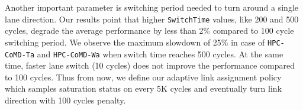 Another important parameter is switching period needed to turn around a 
single lane direction. Our results point that higher \texttt{SwitchTime} 
values, like 200 and 500 cycles, degrade the average performance by less 
than 2\% compared to 100 cycle switching period. We observe the maximum 
slowdown of 25\% in case of \texttt{HPC-CoMD-Ta} and \texttt{HPC-CoMD-Wa} 
when switch time reaches 500 cycles. At the same time, faster lane switch (10 
cycles) does not improve the performance compared to 100 cycles. Thus from 
now, we define our adaptive link assignment policy which samples saturation 
status on every 5K cycles and eventually turn link direction with 100 cycles 
penalty. 




